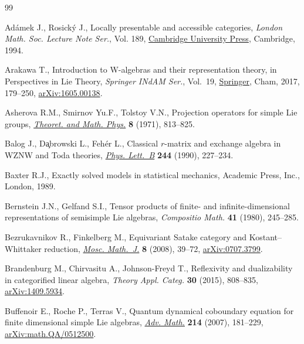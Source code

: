\begin{thebibliography}{99}
\footnotesize\itemsep=0pt

Ad\'amek J., Rosick\'y J., Locally presentable and accessible categories,
 \textit{London Math. Soc. Lecture Note Ser.}, Vol. 189, \href{https://doi.org/10.1017/CBO9780511600579}{Cambridge University
 Press}, Cambridge, 1994.

Arakawa T., Introduction to {W}-algebras and their representation theory, in
 Perspectives in {L}ie {T}heory, \textit{Springer INdAM Ser.}, Vol.~19,
 \href{https://doi.org/10.1007/978-3-319-58971-8_4}{Springer}, Cham, 2017, 179--250, \href{https://arxiv.org/abs/1605.00138}{arXiv:1605.00138}.

Asherova R.M., Smirnov Yu.F., Tolstoy V.N., Projection operators for simple
 {L}ie groups, \href{https://doi.org/10.1007/BF01038003}{\textit{Theoret. and Math. Phys.}} \textbf{8} (1971), 813--825.

Balog J., D\c{a}browski L., Feh\'er L., Classical {$r$}-matrix and exchange
 algebra in {WZNW} and {T}oda theories, \href{https://doi.org/10.1016/0370-2693(90)90060-J}{\textit{Phys. Lett.~B}} \textbf{244}
 (1990), 227--234.

Baxter R.J., Exactly solved models in statistical mechanics, Academic Press,
 Inc., London, 1989.

Bernstein J.N., Gelfand S.I., Tensor products of finite- and
 infinite-dimensional representations of semisimple {L}ie algebras,
 \textit{Compositio Math.} \textbf{41} (1980), 245--285.

Bezrukavnikov R., Finkelberg M., Equivariant {S}atake category and
 {K}ostant--{W}hittaker reduction, \href{https://doi.org/10.17323/1609-4514-2008-8-1-39-72}{\textit{Mosc. Math.~J.}} \textbf{8} (2008),
 39--72, \href{https://arxiv.org/abs/0707.3799}{arXiv:0707.3799}.

Brandenburg M., Chirvasitu A., Johnson-Freyd T., Reflexivity and dualizability
 in categorified linear algebra, \textit{Theory Appl. Categ.} \textbf{30}
 (2015), 808--835, \href{https://arxiv.org/abs/1409.5934}{arXiv:1409.5934}.

Buffenoir E., Roche P., Terras V., Quantum dynamical coboundary equation for
 finite dimensional simple {L}ie algebras, \href{https://doi.org/10.1016/j.aim.2007.02.001}{\textit{Adv. Math.}} \textbf{214}
 (2007), 181--229, \href{https://arxiv.org/abs/math.QA/0512500}{arXiv:math.QA/0512500}.


\end{thebibliography}
